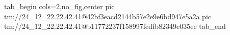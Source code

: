  
 
 
 
 

\qqSecOrig


\ifcmt
  tab_begin cols=2,no_fig,center
    pic tm://24_12_22.22.42.41@42bf3eacd2144b57e2e9e6bd947e5a2a
    pic tm://24_12_22.22.42.41@b11772237f158997fedfb82349e035ee
  tab_end
\fi

